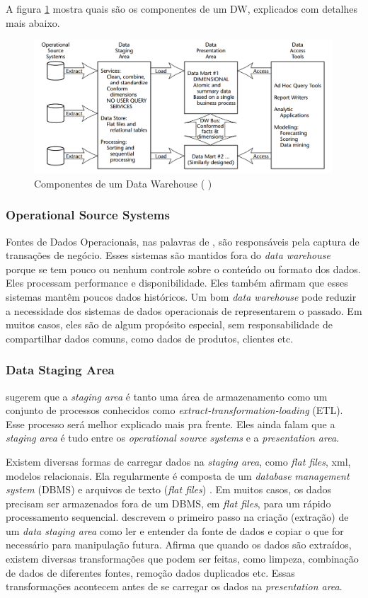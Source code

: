 A figura \ref{dwComponents} mostra quais são os componentes de um DW, explicados com detalhes mais abaixo.
\begin{figure}[H]
\centering
\includegraphics[height=5cm]{imagens/componentes_DW.png}
\caption{Componentes de um Data Warehouse (\citeauthor{kimball2002} \citeyear{kimball2002})}
\label{dwComponents}
\end{figure}

\subsubsection{Operational Source Systems}
Fontes de Dados Operacionais, nas palavras de , são responsáveis pela captura de transações de negócio. Esses sistemas são mantidos fora do \textit{data warehouse} porque se tem pouco ou nenhum controle sobre o conteúdo ou formato dos dados. Eles processam performance e disponibilidade. Eles também afirmam que esses sistemas mantêm poucos dados históricos. Um bom \textit{data warehouse} pode reduzir a necessidade dos sistemas de dados operacionais de representarem o passado. Em muitos casos, eles são de algum propósito especial, sem responsabilidade de compartilhar dados comuns, como dados de produtos, clientes etc.

\subsubsection{Data Staging Area}
 sugerem que a \textit{staging area} é tanto uma área de armazenamento como um conjunto de processos conhecidos como \textit{extract-transformation-loading} (ETL). Esse processo será melhor explicado mais pra frente. Eles ainda falam que a \textit{staging area} é tudo entre os \textit{operational source systems} e a \textit{presentation area}. 

Existem diversas formas de carregar dados na \textit{staging area}, como \textit{flat files}, xml, modelos relacionais. Ela regularmente é composta de um \textit{database management system} (DBMS) e arquivos de texto (\textit{flat files}) \citep{kimball2004}. Em muitos casos, os dados precisam ser armazenados fora de um DBMS, em \textit{flat files}, para um rápido processamento sequencial.
 descrevem o primeiro passo na criação (extração) de um \textit{data staging area} como ler e entender da fonte de dados e copiar o que for necessário para manipulação futura. Afirma que quando os dados são extraídos, existem diversas transformações que podem ser feitas, como limpeza, combinação de dados de diferentes fontes, remoção dados duplicados etc. Essas transformações acontecem antes de se carregar os dados na \textit{presentation area}.

